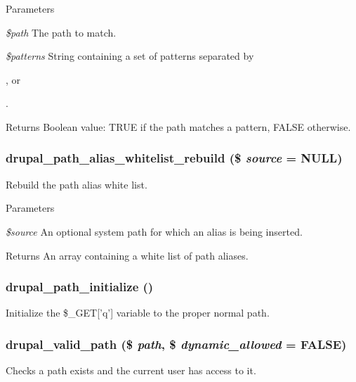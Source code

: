\begin{DoxyParams}{Parameters}
\item[{\em \$path}]The path to match. \item[{\em \$patterns}]String containing a set of patterns separated by \par
,  or \par
.\end{DoxyParams}
\begin{DoxyReturn}{Returns}
Boolean value: TRUE if the path matches a pattern, FALSE otherwise. 
\end{DoxyReturn}
\hypertarget{path_8inc_a98ce949c6766328b89a2b98f31359b14}{
\subsubsection[{drupal\_\-path\_\-alias\_\-whitelist\_\-rebuild}]{\setlength{\rightskip}{0pt plus 5cm}drupal\_\-path\_\-alias\_\-whitelist\_\-rebuild (\$ {\em source} = {\ttfamily NULL})}}
\label{path_8inc_a98ce949c6766328b89a2b98f31359b14}
Rebuild the path alias white list.


\begin{DoxyParams}{Parameters}
\item[{\em \$source}]An optional system path for which an alias is being inserted.\end{DoxyParams}
\begin{DoxyReturn}{Returns}
An array containing a white list of path aliases. 
\end{DoxyReturn}
\hypertarget{path_8inc_ad19e2051aeae309fbf3be8bd072e6fed}{
\subsubsection[{drupal\_\-path\_\-initialize}]{\setlength{\rightskip}{0pt plus 5cm}drupal\_\-path\_\-initialize ()}}
\label{path_8inc_ad19e2051aeae309fbf3be8bd072e6fed}
Initialize the \$\_\-GET\mbox{[}'q'\mbox{]} variable to the proper normal path. \hypertarget{path_8inc_a43d22f8b0e8644306276b7707378a33a}{
\subsubsection[{drupal\_\-valid\_\-path}]{\setlength{\rightskip}{0pt plus 5cm}drupal\_\-valid\_\-path (\$ {\em path}, \/  \$ {\em dynamic\_\-allowed} = {\ttfamily FALSE})}}
\label{path_8inc_a43d22f8b0e8644306276b7707378a33a}
Checks a path exists and the current user has access to it.


